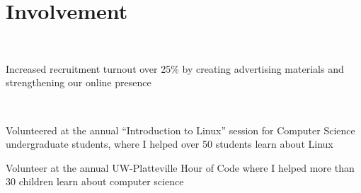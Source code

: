 \documentclass[]{hieudo-build}
\begin{document}
\begin{minipage}[t]{0.62\textwidth}


\section{Involvement}

 \\
\begin{tightemize}
\item Increased recruitment turnout over 25\% by creating advertising materials and strengthening our online presence
\end{tightemize}
\smallsectionsep

 \\
\begin{tightemize}
\item Volunteered at the annual “Introduction to Linux” session for Computer Science undergraduate students, where I helped over 50 students learn about Linux
\item Volunteer at the annual UW-Platteville Hour of Code where I helped more than 30 children learn about computer science
\end{tightemize}
\smallsectionsep


\end{minipage}
\end{document}
